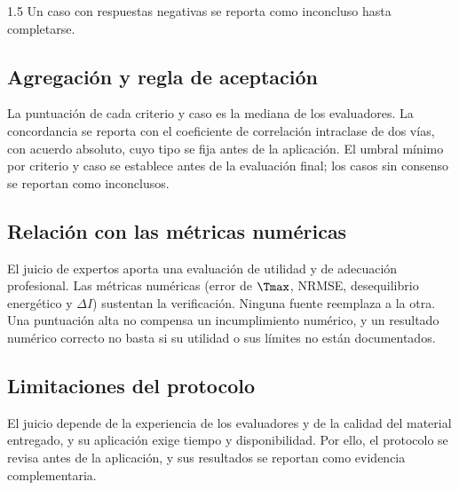 \begin{spacing}{1.5}
Un caso con respuestas negativas se reporta como inconcluso hasta completarse.

\subsection{Agregación y regla de aceptación}

La puntuación de cada criterio y caso es la mediana de los evaluadores. La concordancia se reporta con el coeficiente de correlación intraclase de dos vías, con acuerdo absoluto, cuyo tipo se fija antes de la aplicación. El umbral mínimo por criterio y caso se establece antes de la evaluación final; los casos sin consenso se reportan como inconclusos.

\subsection{Relación con las métricas numéricas}

El juicio de expertos aporta una evaluación de utilidad y de adecuación profesional. Las métricas numéricas (error de $\Tmax$, NRMSE, desequilibrio energético y $\Delta I$) sustentan la verificación. Ninguna fuente reemplaza a la otra. Una puntuación alta no compensa un incumplimiento numérico, y un resultado numérico correcto no basta si su utilidad o sus límites no están documentados.

\subsection{Limitaciones del protocolo}

El juicio depende de la experiencia de los evaluadores y de la calidad del material entregado, y su aplicación exige tiempo y disponibilidad. Por ello, el protocolo se revisa antes de la aplicación, y sus resultados se reportan como evidencia complementaria.
\end{spacing}

